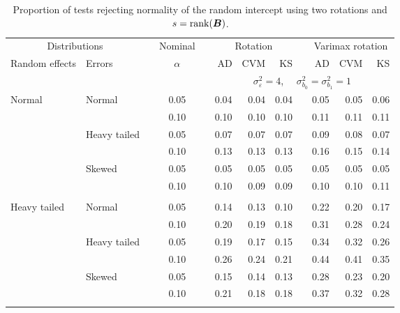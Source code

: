 \begin{table}[ht]
\centering
\caption{\label{tab:simb0sB} Proportion of tests rejecting normality of the random intercept using two rotations and $s = \operatorname{rank}(\bm{B})$.}
\begin{scriptsize}
\begin{tabular}{ll p{.1cm} c p{.1cm} rrr p{.1cm} rrr}
  \hline
  \multicolumn{2}{c}{Distributions}& & Nominal & &  \multicolumn{3}{c}{Rotation} & & \multicolumn{3}{c}{Varimax rotation} \\ \cline{1-2} \cline{6-8} \cline{10-12}   
  Random effects & Errors & & $\alpha$ & & AD & CVM & KS & & AD & CVM & KS \\ 
   \hline
& && && \multicolumn{7}{c}{$\sigma_{\varepsilon}^2 = 4$, \ \ $\sigma_{b_0}^2 = \sigma_{b_1}^2 = 1$} \\ \cline{6-12}
\rowcolor{gray!20}Normal       & Normal       && 0.05 &&   0.04 & 0.04 & 0.04 && 0.05 & 0.05 & 0.06 \\ 
\rowcolor{gray!20}             &              && 0.10 &&   0.10 & 0.10 & 0.10 && 0.11 & 0.11 & 0.11 \\ 
\rowcolor{gray!20}             & Heavy tailed && 0.05 &&   0.07 & 0.07 & 0.07 && 0.09 & 0.08 & 0.07 \\ 
\rowcolor{gray!20}             &              && 0.10 &&   0.13 & 0.13 & 0.13 && 0.16 & 0.15 & 0.14 \\ 
\rowcolor{gray!20}             & Skewed       && 0.05 &&   0.05 & 0.05 & 0.05 && 0.05 & 0.05 & 0.05 \\ 
\rowcolor{gray!20}             &              && 0.10 &&   0.10 & 0.09 & 0.09 && 0.10 & 0.10 & 0.11 \\ 
             &&&&&&&&&&&\\
Heavy tailed & Normal       && 0.05 &&   0.14 & 0.13 & 0.10 && 0.22 & 0.20 & 0.17 \\ 
             &              && 0.10 &&   0.20 & 0.19 & 0.18 && 0.31 & 0.28 & 0.24 \\ 
             & Heavy tailed && 0.05 &&   0.19 & 0.17 & 0.15 && 0.34 & 0.32 & 0.26 \\ 
             &              && 0.10 &&   0.26 & 0.24 & 0.21 && 0.44 & 0.41 & 0.35 \\ 
             & Skewed       && 0.05 &&   0.15 & 0.14 & 0.13 && 0.28 & 0.23 & 0.20 \\ 
             &              && 0.10 &&   0.21 & 0.18 & 0.18 && 0.37 & 0.32 & 0.28 \\ 
             &&&&&&&&&&&\\

\end{tabular}
\end{scriptsize}
\end{table}
